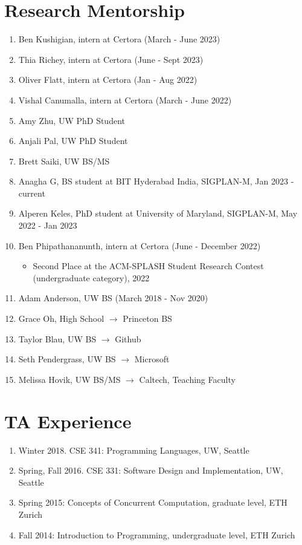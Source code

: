\documentclass[margin, 10pt]{res} %
\begin{document}
\begin{resume}
\section{Research Mentorship}
\begin{enumerate}
  \item Ben Kushigian, intern at Certora (March - June 2023)
  \item Thia Richey, intern at Certora (June - Sept 2023)
  \item Oliver Flatt, intern at Certora (Jan - Aug 2022)
  \item Vishal Canumalla, intern at Certora (March - June 2022)
  \item Amy Zhu, UW PhD Student
  \item Anjali Pal, UW PhD Student
  \item Brett Saiki, UW BS/MS
  \item Anagha G, BS student at BIT Hyderabad India, SIGPLAN-M, Jan 2023 - current
  \item Alperen Keles, PhD student at University of Maryland, SIGPLAN-M, May 2022 - Jan 2023
  \item Ben Phipathananunth, intern at Certora (June - December 2022)
     \begin{itemize}
       \item Second Place at the ACM-SPLASH Student Research Contest (undergraduate category), 2022
     \end{itemize}
  \item Adam Anderson, UW BS (March 2018 - Nov 2020)
  \item Grace Oh, High School $\rightarrow$ Princeton BS
  \item Taylor Blau, UW BS $\rightarrow$ Github
  \item Seth Pendergrass, UW BS $\rightarrow$ Microsoft
  \item Melissa Hovik, UW BS/MS $\rightarrow$ Caltech, Teaching Faculty
\end{enumerate}

\section{TA Experience}
\begin{enumerate}
\item Winter 2018. CSE 341: Programming Languages, UW, Seattle
\item Spring, Fall 2016. CSE 331: Software Design and Implementation, UW, Seattle
\item Spring 2015: Concepts of Concurrent Computation, graduate level, ETH Zurich
\item Fall 2014: Introduction to Programming, undergraduate level, ETH Zurich
\end{enumerate}




\end{resume}
\end{document}
